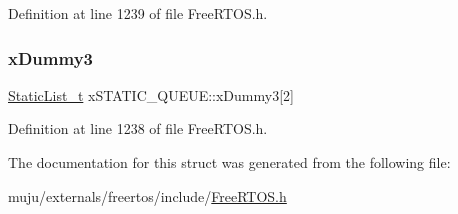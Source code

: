 Definition at line 1239 of file Free\+R\+T\+O\+S.\+h.

\mbox{\label{structx_s_t_a_t_i_c___q_u_e_u_e_add0de93e08b632124122850bcd543597}} 
\subsubsection{\texorpdfstring{x\+Dummy3}{xDummy3}}
{\footnotesize\ttfamily \hyperlink{externals_2freertos_2include_2_free_r_t_o_s_8h_a9735ad9101a2bd25f83a62089a4acee6}{Static\+List\+\_\+t} x\+S\+T\+A\+T\+I\+C\+\_\+\+Q\+U\+E\+U\+E\+::x\+Dummy3\mbox{[}2\mbox{]}}



Definition at line 1238 of file Free\+R\+T\+O\+S.\+h.



The documentation for this struct was generated from the following file\+:\begin{DoxyCompactItemize}
\item 
muju/externals/freertos/include/\hyperlink{externals_2freertos_2include_2_free_r_t_o_s_8h}{Free\+R\+T\+O\+S.\+h}\end{DoxyCompactItemize}
